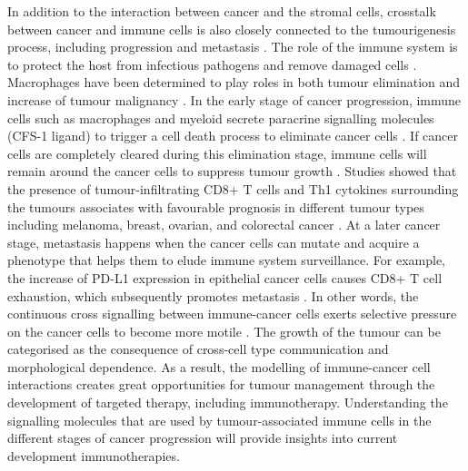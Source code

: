 In addition to the interaction between cancer and the stromal cells, crosstalk between cancer and immune cells is also closely connected to the tumourigenesis process, including progression and metastasis \cite{wang2017role}. The role of the immune system is to protect the host from infectious pathogens and remove damaged cells \cite{davis2007molecular}. Macrophages have been determined to play roles in both tumour elimination and increase of tumour malignancy \cite{wyckoff2007direct, chung2005molecular}. In the early stage of cancer progression, immune cells such as macrophages and myeloid secrete paracrine signalling molecules (\ie CFS-1 ligand)  to trigger a cell death process to eliminate cancer cells \cite{wyckoff2007direct}. If cancer cells are completely cleared during this elimination stage, immune cells will remain around the cancer cells to suppress tumour growth \cite{bronkhorst2011detection, ly2010aged}. Studies showed that the presence of tumour-infiltrating CD8+ T cells and Th1 cytokines surrounding the tumours associates with favourable prognosis in different tumour types including melanoma, breast, ovarian, and colorectal cancer \cite{fridman2012immune, shalapour2015immunity}. At a later cancer stage, metastasis happens when the cancer cells can mutate and acquire a phenotype that helps them to elude immune system surveillance. For example, the increase of PD-L1 expression in epithelial cancer cells causes CD8+ T cell exhaustion, which subsequently promotes metastasis \cite{chen2014metastasis, wei2019combination}. In other words, the continuous cross signalling between immune-cancer cells exerts selective pressure on the cancer cells to become more motile \cite{giampieri2009localized,ilina2009mechanisms}. The growth of the tumour can be categorised as the consequence of cross-cell type communication and morphological dependence. As a result, the modelling of immune-cancer cell interactions creates great opportunities for tumour management through the development of targeted therapy, including immunotherapy. Understanding the signalling molecules that are used by tumour-associated immune cells in the different stages of cancer progression will provide insights into current development immunotherapies.  

